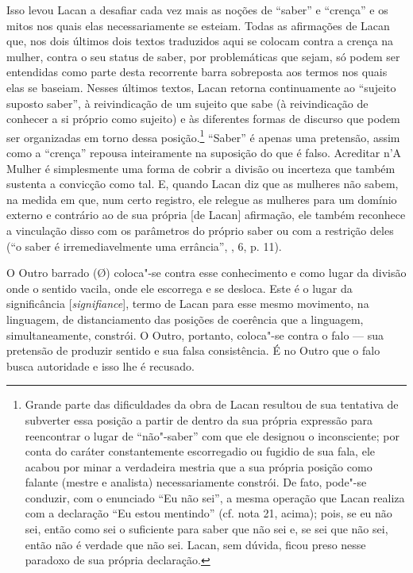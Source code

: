 Isso levou Lacan a desafiar cada vez mais as noções de ``saber'' e
``crença'' e os mitos nos quais elas necessariamente se esteiam. Todas
as afirmações de Lacan que, nos dois últimos dois textos traduzidos aqui
se colocam contra a crença na mulher, contra o seu status de saber, por
problemáticas que sejam, só podem ser entendidas como parte desta
recorrente barra sobreposta aos termos nos quais elas se baseiam. Nesses
últimos textos, Lacan retorna continuamente ao ``sujeito suposto
saber'', à reivindicação de um sujeito que sabe (à reivindicação de
conhecer a si próprio como sujeito) e às diferentes formas de discurso
que podem ser organizadas em torno dessa posição.\footnote{Grande parte
  das dificuldades da obra de Lacan resultou de sua tentativa de
  subverter essa posição a partir de dentro da sua própria expressão
  para reencontrar o lugar de ``não"-saber'' com que ele designou o
  inconsciente; por conta do caráter constantemente escorregadio ou
  fugidio de sua fala, ele acabou por minar a verdadeira mestria que a
  sua própria posição como falante (mestre e analista) necessariamente
  constrói. De fato, pode"-se conduzir, com o enunciado ``Eu não sei'', a
  mesma operação que Lacan realiza com a declaração ``Eu estou
  mentindo'' (cf. nota 21, acima); pois, se eu não sei, então como sei o
  suficiente para saber que não sei e, se sei que não sei, então não é
  verdade que não sei. Lacan, sem dúvida, ficou preso nesse paradoxo de
  sua própria declaração.} ``Saber'' é apenas uma pretensão, assim como
a ``crença'' repousa inteiramente na suposição do que é falso. Acreditar
n'A Mulher é simplesmente uma forma de cobrir a divisão ou incerteza que
também sustenta a convicção como tal. E, quando Lacan diz que as
mulheres não sabem, na medida em que, num certo registro, ele relegue as
mulheres para um domínio externo e contrário ao de sua própria {[}de
Lacan{]} afirmação, ele também reconhece a vinculação disso com os
parâmetros do próprio saber ou com a restrição deles (``o saber é
irremediavelmente uma errância'', , 6, p. 11).

O Outro barrado (Ø) coloca"-se contra esse conhecimento e como lugar da
divisão onde o sentido vacila, onde ele escorrega e se desloca. Este é o
lugar da significância {[}\emph{signifiance}{]}, termo de Lacan para
esse mesmo movimento, na linguagem, de distanciamento das posições de
coerência que a linguagem, simultaneamente, constrói. O Outro, portanto,
coloca"-se contra o falo --- sua pretensão de produzir sentido e sua falsa
consistência. É no Outro que o falo busca autoridade e isso lhe é
recusado.

